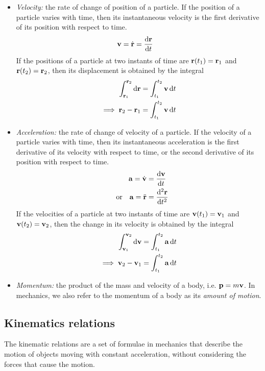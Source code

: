 \begin{itemize}
    	\item \emph{Velocity:} the rate of change of position of a particle. If the position of a particle varies with time, then its instantaneous velocity is the first derivative of its position with respect to time.
    	\begin{align}
    		\vb{v}=\dot{\vb{r}}&=\dv{\vb{r}}{t} \label{eqn:vel-vec}
    	\end{align}
    	If the positions of a particle at two instants of time are $\vb{r}(t_1)=\vb{r}_1$ and $\vb{r}(t_2)=\vb{r}_2$, then its displacement is obtained by the integral
    	\begin{align}
    		\int_{\vb{r}_1}^{\vb{r}_2}{\dd{\vb{r}}}&=\int_{t_1}^{t_2}{\vb{v}\dd{t}} \nonumber\\
    		\implies\vb{r}_2-\vb{r}_1&=\int_{t_1}^{t_2}{\vb{v}\dd{t}} \label{eqn:disp-integ}
    	\end{align}
    	
    	\item \emph{Acceleration:} the rate of change of velocity of a particle. If the velocity of a particle varies with time, then its instantaneous acceleration is the first derivative of its velocity with respect to time, or the second derivative of its position with respect to time.
    	\begin{align}
    		\vb{a}=\dot{\vb{v}}&=\dv{\vb{v}}{t} \label{eqn:acc-vec:v}\\
    		\qq{or}\vb{a}=\ddot{\vb{r}}&=\dv[2]{\vb{r}}{t} \label{eqn:acc-vec:r}
    	\end{align}
    	If the velocities of a particle at two instants of time are $\vb{v}(t_1)=\vb{v}_1$ and $\vb{v}(t_2)=\vb{v}_2$, then the change in its velocity is obtained by the integral
    	\begin{align}
    		\int_{\vb{v}_1}^{\vb{v}_2}{\dd{\vb{v}}}&=\int_{t_1}^{t_2}{\vb{a}\dd{t}} \nonumber\\
    		\implies\vb{v}_2-\vb{v}_1&=\int_{t_1}^{t_2}{\vb{a}\dd{t}} \label{eqn:vel-integ}
    	\end{align}
    	
    	\item \emph{Momentum:} the product of the mass and velocity of a body, i.e. $\vb{p}=m\vb{v}$. In mechanics, we also refer to the momentum of a body as its \emph{amount of motion}.
    \end{itemize}
    
    \subsection{Kinematics relations}
    	The kinematic relations are a set of formulae in mechanics that describe the motion of objects moving with constant acceleration, without considering the forces that cause the motion.
    	
